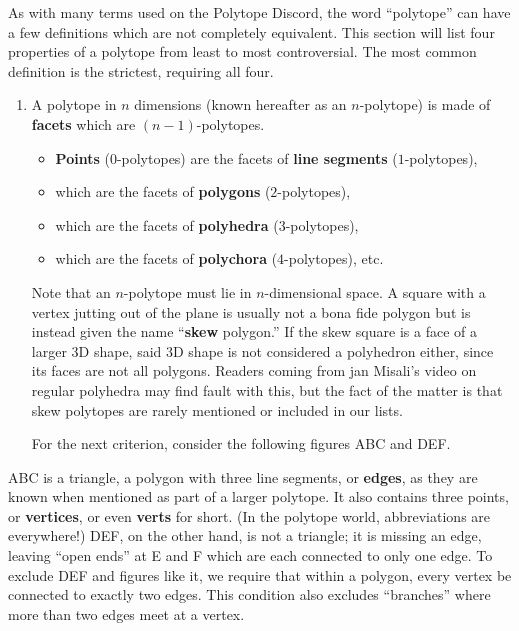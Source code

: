 \documentclass{article}
\begin{document}
As with many terms used on the Polytope Discord,
the word ``polytope'' can have a few definitions which are not completely equivalent.
This section will list four properties of a polytope from least to most controversial.
The most common definition is the strictest, requiring all four.
\begin{enumerate}
  \item
A polytope in $n$ dimensions (known hereafter as an $n$-polytope)
is made of \textbf{facets} which are $(n-1)$-polytopes.
\begin{itemize}
  \item \textbf{Points} ($0$-polytopes) are the facets of \textbf{line segments} ($1$-polytopes),
  \item which are the facets of \textbf{polygons} ($2$-polytopes),
  \item which are the facets of \textbf{polyhedra} ($3$-polytopes),
  \item which are the facets of \textbf{polychora} ($4$-polytopes), etc.
\end{itemize}

Note that an $n$-polytope must lie in $n$-dimensional space.
A square with a vertex jutting out of the plane is usually not a bona fide polygon
but is instead given the name ``\textbf{skew} polygon.''
If the skew square is a face of a larger 3D shape,
said 3D shape is not considered a polyhedron either,
since its faces are not all polygons.
Readers coming from jan Misali's video on regular polyhedra may find fault with this,
but the fact of the matter is that
skew polytopes are rarely mentioned or included in our lists.

For the next criterion, consider the following figures ABC and DEF.
\end{enumerate}

\begin{center}
\end{center}

ABC is a triangle, a polygon with three line segments, or \textbf{edges},
as they are known when mentioned as part of a larger polytope.
It also contains three points, or \textbf{vertices}, or even \textbf{verts} for short.
(In the polytope world, abbreviations are everywhere!)
DEF, on the other hand, is not a triangle; it is missing an edge,
leaving ``open ends'' at E and F which are each connected to only one edge.
To exclude DEF and figures like it,
we require that within a polygon, every vertex be connected to exactly two edges.
This condition also excludes ``branches'' where more than two edges meet at a vertex.
\end{document}
